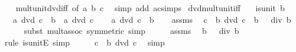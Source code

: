 \begin{isabellebody}
%
\isadelimproof
\ \ %
\endisadelimproof
%
\isatagproof
{}\isamarkupfalse%
\ mult{\isacharunderscore}{\kern0pt}unit{\isacharunderscore}{\kern0pt}dvd{\isacharunderscore}{\kern0pt}iff\ {\isacharbrackleft}{\kern0pt}of\ a\ b\ c{\isacharbrackright}{\kern0pt}\ \isamarkupfalse%
\ {\isacharparenleft}{\kern0pt}simp\ add{\isacharcolon}{\kern0pt}\ ac{\isacharunderscore}{\kern0pt}simps{\isacharparenright}{\kern0pt}%
\endisatagproof
{\isafoldproof}%
%
\isadelimproof
\isanewline
%
\endisadelimproof
\isanewline
{}\isamarkupfalse%
\ dvd{\isacharunderscore}{\kern0pt}mult{\isacharunderscore}{\kern0pt}unit{\isacharunderscore}{\kern0pt}iff{\isacharcolon}{\kern0pt}\isanewline
\ \ \ {\isachardoublequoteopen}is{\isacharunderscore}{\kern0pt}unit\ b{\isachardoublequoteclose}\isanewline
\ \ \ {\isachardoublequoteopen}a\ dvd\ c\ {\isacharasterisk}{\kern0pt}\ b\ {\isasymlongleftrightarrow}\ a\ dvd\ c{\isachardoublequoteclose}\isanewline
%
\isadelimproof
%
\endisadelimproof
%
\isatagproof
{}\isamarkupfalse%
\isanewline
\ \ \isamarkupfalse%
\ {\isachardoublequoteopen}a\ dvd\ c\ {\isacharasterisk}{\kern0pt}\ b{\isachardoublequoteclose}\isanewline
\ \ \isamarkupfalse%
\ assms\ \isamarkupfalse%
\ {\isachardoublequoteopen}c\ {\isacharasterisk}{\kern0pt}\ b\ dvd\ c\ {\isacharasterisk}{\kern0pt}\ {\isacharparenleft}{\kern0pt}b\ {\isacharasterisk}{\kern0pt}\ {\isacharparenleft}{\kern0pt}{}\ div\ b{\isacharparenright}{\kern0pt}{\isacharparenright}{\kern0pt}{\isachardoublequoteclose}\isanewline
\ \ \ \ \isamarkupfalse%
\ {\isacharparenleft}{\kern0pt}subst\ mult{\isacharunderscore}{\kern0pt}assoc\ {\isacharbrackleft}{\kern0pt}symmetric{\isacharbrackright}{\kern0pt}{\isacharparenright}{\kern0pt}\ simp\isanewline
\ \ \isamarkupfalse%
\ \isamarkupfalse%
\ assms\ \isamarkupfalse%
\ {\isachardoublequoteopen}b\ {\isacharasterisk}{\kern0pt}\ {\isacharparenleft}{\kern0pt}{}\ div\ b{\isacharparenright}{\kern0pt}\ {\isacharequal}{\kern0pt}\ {}{\isachardoublequoteclose}\isanewline
\ \ \ \ \isamarkupfalse%
\ {\isacharparenleft}{\kern0pt}rule\ is{\isacharunderscore}{\kern0pt}unitE{\isacharparenright}{\kern0pt}\ simp\isanewline
\ \ \isamarkupfalse%
\ \isamarkupfalse%
\ {\isachardoublequoteopen}c\ {\isacharasterisk}{\kern0pt}\ b\ dvd\ c{\isachardoublequoteclose}\ \isamarkupfalse%
\ simp\isanewline

\end{isabellebody}
